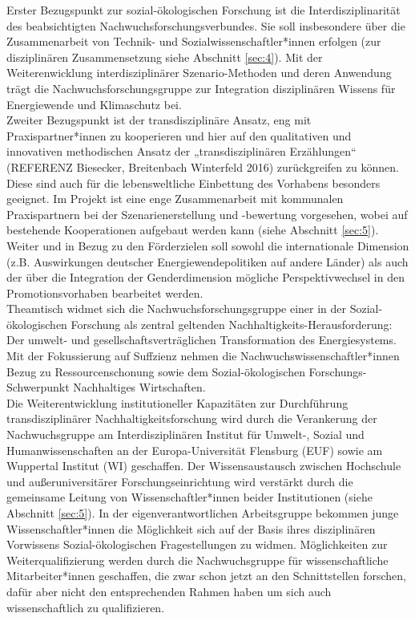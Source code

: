 \documentclass[a4paper,11pt,twoside]{scrartcl}
\begin{document}
Erster Bezugspunkt zur sozial-ökologischen Forschung ist die Interdisziplinarität des beabsichtigten Nachwuchsforschungsverbundes. Sie soll insbesondere über die Zusammenarbeit von Technik- und Sozialwissenschaftler*innen erfolgen (zur disziplinären Zusammensetzung siehe Abschnitt \ref{sec:4}). Mit der Weiterenwicklung interdisziplinärer Szenario-Methoden und deren Anwendung trägt die Nachwuchsforschungsgruppe zur Integration disziplinären Wissens für Energiewende und Klimaschutz bei.\\
Zweiter Bezugspunkt ist der transdisziplinäre Ansatz, eng mit Praxispartner*innen zu kooperieren und hier auf den qualitativen und innovativen methodischen Ansatz der „transdisziplinären Erzählungen“ (REFERENZ Biesecker, Breitenbach Winterfeld 2016) zurückgreifen zu können. Diese sind auch für die lebensweltliche Einbettung des Vorhabens besonders geeignet. Im Projekt ist eine enge Zusammenarbeit mit kommunalen Praxispartnern bei der Szenarienerstellung und -bewertung vorgesehen, wobei auf bestehende Kooperationen aufgebaut werden kann (siehe Abschnitt \ref{sec:5}).\\
Weiter und in Bezug zu den Förderzielen soll sowohl die internationale Dimension (z.B. Auswirkungen deutscher Energiewendepolitiken auf andere Länder) als auch der über die Integration der Genderdimension mögliche Perspektivwechsel in den Promotionsvorhaben bearbeitet werden.\\
Theamtisch widmet sich die Nachwuchsforschungsgruppe einer in der Sozial-ökologischen Forschung als zentral geltenden Nachhaltigkeits-Herausforderung: Der umwelt- und gesellschaftsverträglichen Transformation des Energiesystems. Mit der Fokussierung auf Suffzienz nehmen die Nachwuchswissenschaftler*innen Bezug zu Ressourcenschonung sowie dem Sozial-ökologischen Forschungs-Schwerpunkt Nachhaltiges Wirtschaften.\\
Die Weiterentwicklung institutioneller Kapazitäten zur Durchführung transdisziplinärer Nachhaltigkeitsforschung wird durch die Verankerung der Nachwuchsgruppe am Interdisziplinären Institut für Umwelt-, Sozial und Humanwissenschaften an der Europa-Universität Flensburg (EUF) sowie am Wuppertal Institut (WI) geschaffen. Der Wissensaustausch zwischen Hochschule und außeruniversitärer Forschungseinrichtung wird verstärkt durch die gemeinsame Leitung von Wissenschaftler*innen beider Institutionen (siehe Abschnitt \ref{sec:5}). In der eigenverantwortlichen Arbeitsgruppe bekommen junge Wissenschaftler*innen die Möglichkeit sich auf der Basis ihres disziplinären Vorwissens Sozial-ökologischen Fragestellungen zu widmen. Möglichkeiten zur Weiterqualifizierung werden durch die Nachwuchsgruppe für wissenschaftliche Mitarbeiter*innen geschaffen, die zwar schon jetzt an den Schnittstellen forschen, dafür aber nicht den entsprechenden Rahmen haben um sich auch wissenschaftlich zu qualifizieren.
\end{document}
